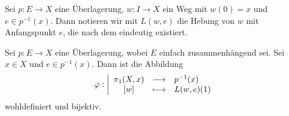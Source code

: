 
\begin{notation*}
    Sei $p\colon  E \to  X$ eine Überlagerung, $w\colon  I \to  X$ ein Weg mit $w(0) = x$ und  $e\in p^{-1} (x)$. Dann notieren wir mit $L(w,e)$ die Hebung von  $w$ mit Anfangspunkt  $e$, die nach dem  eindeutig existiert.
\end{notation*}

\begin{theorem}\label{thm:fundamentalgruppe-durch-überlagerung-mit-einfach-zusammenhängendem-raum}
    Sei $p\colon  E \to  X$ eine Überlagerung, wobei $E$ einfach zusammenhängend sei. Sei $x\in X$ und $e\in p^{-1} (x)$. Dann ist die Abbildung
        \begin{equation*}
        \varphi : \left| \begin{array}{c c l} 
            \pi_1(X,x) & \longrightarrow & p^{-1} (x) \\
            \left[w\right] & \longmapsto &  L(w,e)(1)
        \end{array} \right.
    \end{equation*}
    wohldefiniert und bijektiv.
\end{theorem}

